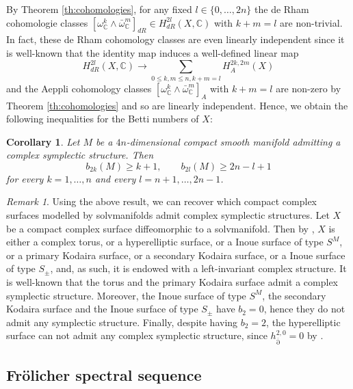 \documentclass[a4paper]{amsart}
\newtheorem{corollary}[theorem]{Corollary}
\theoremstyle{definition}
\theoremstyle{remark}
\newtheorem{remark}[theorem]{Remark}
\newcommand{\bC}{{\mathbb C}}
\newcommand{\delbar}{\operatorname{\overline{\partial}}}
\numberwithin{equation}{section}
\begin{document}
By Theorem \ref{th:cohomologies}, for any fixed $l\in \{0,\ldots,2n\}$ the de Rham cohomologie classes $[\omega_{\bC}^k\wedge \bar \omega_{\bC}^m]_{dR}\in H^{2l}_{dR}(X,\bC)$ with $k+m=l$ are non-trivial. In fact, these de Rham cohomology classes are even linearly independent since it is well-known that the identity map induces a well-defined linear map 
\[
H^{2l}_{dR}(X,\bC)\rightarrow \sum_{0\leq k,m\leq n, k+m=l} H^{2k,2m}_A(X)
\]
and the Aeppli cohomology classes $[\omega_{\bC}^k\wedge \bar \omega_{\bC}^m]_{A}$ with $k+m=l$ are non-zero by Theorem \ref{th:cohomologies} and so are linearly independent. Hence, we obtain the following inequalities for the Betti numbers of $X$:
	
\begin{corollary}\label{co:bettinumbers}
Let $M$ be a $4n$-dimensional compact smooth manifold admitting a complex symplectic structure. Then
\begin{equation*}
b_{2k}(M)\geq k+1,\qquad b_{2l}(M)\geq 2n-l+1
\end{equation*}
for every $k=1,\ldots, n$ and every $l=n+1,\ldots,2n-1$.
	\end{corollary}
	
\begin{remark}
Using the above result, we can recover which compact complex surfaces modelled by solvmanifolds admit complex symplectic structures. Let $X$ be a compact complex surface diffeomorphic to a solvmanifold. Then by \cite[Theorem 1]{hasegawa}, $X$ is either a complex torus, or a hyperelliptic surface, or a Inoue surface of type $S^M$, or a primary Kodaira surface, or a secondary Kodaira surface, or a Inoue surface of type $S_\pm$, and, as such, it is endowed with a left-invariant complex structure. It is well-known that the torus and the primary Kodaira surface admit a complex symplectic structure. Moreover, the Inoue surface of type $S^M$, the secondary Kodaira surface and the Inoue surface of type $S_\pm$ have $b_2=0$, hence they do not admit any symplectic structure. Finally, despite having $b_2=2$, the hyperelliptic surface can not admit any complex symplectic structure, since $h^{2,0}_{\delbar}=0$ by \cite{angella-dloussky-tomassini}.
	\end{remark}



\subsection{Fr\"olicher spectral sequence}
\end{document}
